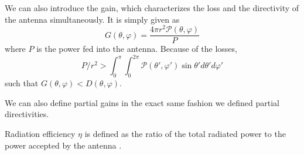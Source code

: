 We can also introduce the gain, which characterizes the loss
and the directivity of the antenna simultaneously. It is simply given
as
  \begin{equation}
    G(\theta,\varphi) = \frac{4\pi r^2\mathcal{P}(\theta,\varphi)}{P}
  \end{equation}
where $P$ is the power fed into the antenna. Because of the 
losses, 
	\begin{equation*}
		P/r^2>\int_0^\pi\int_0^{2\pi}\mathcal{P}(\theta',\varphi')\sin\theta'd\theta'd\varphi'
	\end{equation*}
such that $G(\theta,\varphi)<D(\theta,\varphi)$. 

We can also define partial gains in the exact same fashion we defined partial
directivities.

Radiation efficiency $\eta$ is defined as the ratio of the total radiated power 
to the power accepted by the antenna \cite{IEEE145-1993}.

